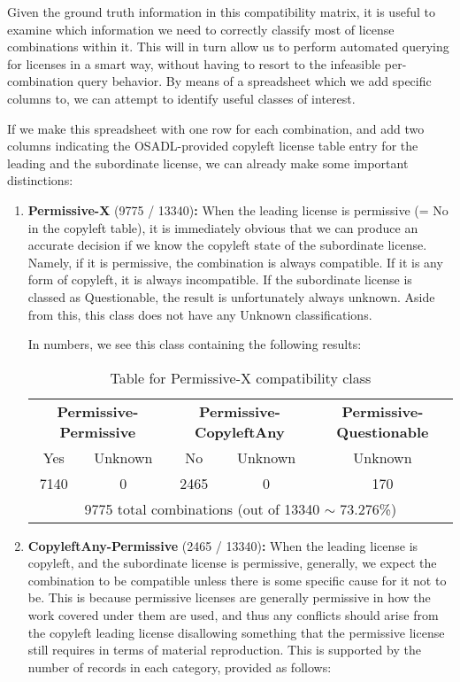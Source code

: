 Given the ground truth information in this compatibility matrix, it is useful to examine which information we need to correctly classify most of license combinations within it. This will in turn allow us to perform automated querying for licenses in a smart way, without having to resort to the infeasible per-combination query behavior. By means of a spreadsheet which we add specific columns to, we can attempt to identify useful classes of interest.

If we make this spreadsheet with one row for each combination, and add two columns indicating the OSADL-provided copyleft license table entry for the leading and the subordinate license, we can already make some important distinctions:

\begin{enumerate}
	\item \textbf{Permissive-X} (9775 / 13340)\textbf{:} When the leading license is permissive (= No in the copyleft table), it is immediately obvious that we can produce an accurate decision if we know the copyleft state of the subordinate license. Namely, if it is permissive, the combination is always compatible. If it is any form of copyleft, it is always incompatible. If the subordinate license is classed as Questionable, the result is unfortunately always unknown. Aside from this, this class does not have any Unknown classifications.
	
	In numbers, we see this class containing the following results:
	
	\begin{table}[h]
		\caption{Table for Permissive-X compatibility class}
		\label{tab:permissive-x-table}
		\centering
		\begin{tabular}{|cc|cc|c|}
			\hline
			\multicolumn{2}{|c|}{\textbf{Permissive-Permissive}} & \multicolumn{2}{|c|}{\textbf{Permissive-CopyleftAny}} & \textbf{Permissive-Questionable} \\
			Yes & Unknown & No & Unknown & Unknown \\
			7140 & 0 & 2465 & 0 & 170 \\\hline
			\multicolumn{5}{|c|}{9775 total combinations (out of 13340 $\sim$ 73.276\%)} \\
			\hline
		\end{tabular}
	\end{table}
	
	\item \textbf{CopyleftAny-Permissive} (2465 / 13340)\textbf{:} When the leading license is copyleft, and the subordinate license is permissive, generally, we expect the combination to be compatible unless there is some specific cause for it not to be. This is because permissive licenses are generally permissive in how the work covered under them are used, and thus any conflicts should arise from the copyleft leading license disallowing something that the permissive license still requires in terms of material reproduction. This is supported by the number of records in each category, provided as follows:
	

\end{enumerate}
